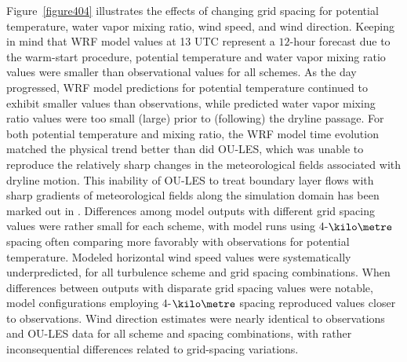 Figure~\ref{figure404} illustrates the effects of changing grid spacing for potential temperature, water vapor mixing ratio, wind speed, and wind direction. Keeping in mind that WRF model values at 13 UTC represent a $12$-hour forecast due to the warm-start procedure, potential temperature and water vapor mixing ratio values were smaller than observational values for all schemes. As the day progressed, WRF model predictions for potential temperature continued to exhibit smaller values than observations, while predicted water vapor mixing ratio values were too small (large) prior to (following) the dryline passage. For both potential temperature and mixing ratio, the WRF model time evolution matched the physical trend better than did OU-LES, which was unable to reproduce the relatively sharp changes in the meteorological fields associated with dryline motion. This inability of OU-LES to treat boundary layer flows with sharp gradients of meteorological fields along the simulation domain has been marked out in  \citet{Confe2008}. Differences among model outputs with different grid spacing values were rather small for each scheme, with model runs using $4$-$\kilo\metre$ spacing often comparing more favorably with observations for potential temperature. Modeled horizontal wind speed values were systematically underpredicted, for all turbulence scheme and grid spacing combinations. When differences between outputs with disparate grid spacing values were notable, model configurations employing $4$-$\kilo\metre$ spacing reproduced values closer to observations. Wind direction estimates were nearly identical to observations and OU-LES data for all scheme and spacing combinations, with rather inconsequential differences related to grid-spacing variations.


